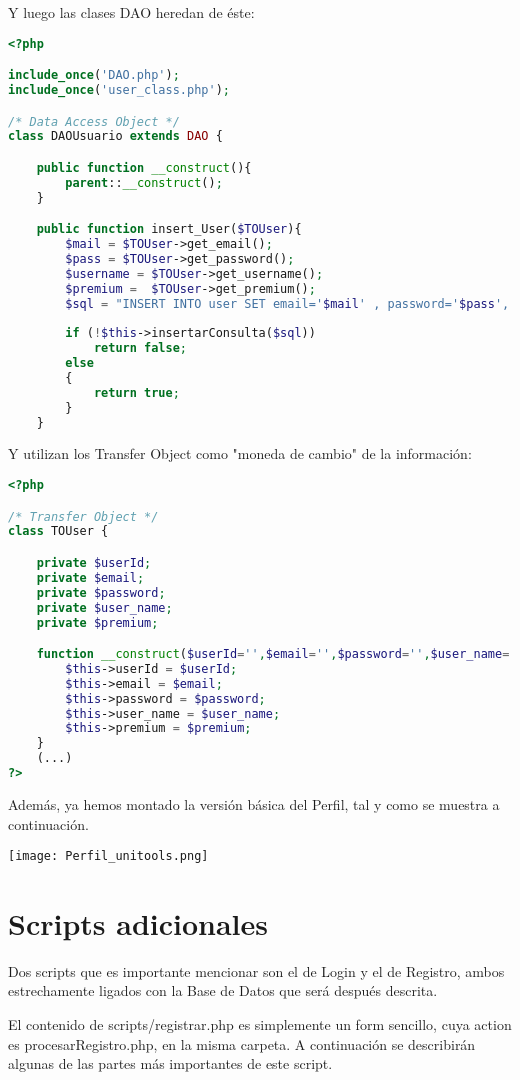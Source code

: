 \documentclass[12pt]{report}
\begin{document}
Y luego las clases DAO heredan de éste:
\newline
\begin{lstlisting}[language=PHP]
<?php

include_once('DAO.php');
include_once('user_class.php');

/* Data Access Object */
class DAOUsuario extends DAO {

	public function __construct(){
		parent::__construct();
	}

	public function insert_User($TOUser){
		$mail = $TOUser->get_email();
        $pass = $TOUser->get_password();
        $username = $TOUser->get_username();
        $premium =  $TOUser->get_premium();
		$sql = "INSERT INTO user SET email='$mail' , password='$pass', username='$username', premium='$premium'";
		
		if (!$this->insertarConsulta($sql))
			return false;
		else 
		{
			return true;
		}
	}
\end{lstlisting}

Y utilizan los Transfer Object como "moneda de cambio" de la información:
\newline
\begin{lstlisting}[language=PHP]
<?php

/* Transfer Object */
class TOUser {

	private $userId;
	private $email;
	private $password;
	private $user_name;
	private $premium;

	function __construct($userId='',$email='',$password='',$user_name='',$premium=''){
		$this->userId = $userId;
		$this->email = $email;
		$this->password = $password;
		$this->user_name = $user_name;
		$this->premium = $premium;
	}
	(...)
?>
\end{lstlisting}
Además, ya hemos montado la versión básica del Perfil, tal y como se muestra a continuación.

\texttt{[image: Perfil\_unitools.png]}

 \newpage
\section{Scripts adicionales}
Dos scripts que es importante mencionar son el de Login y el de Registro, ambos estrechamente ligados con la Base de Datos que será después descrita. 

El contenido de scripts/registrar.php es simplemente un form sencillo, cuya action es procesarRegistro.php, en la misma carpeta. A continuación se describirán algunas de las partes más importantes de este script.
\end{document}
